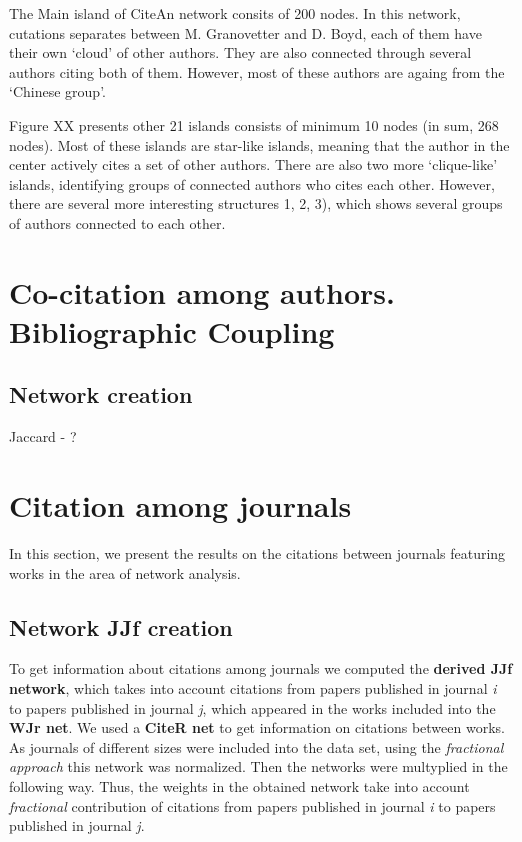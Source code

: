 \documentclass[11pt]{article} %
\begin{document}
The Main island of CiteAn network consits of 200 nodes. In this network, cutations separates between M. Granovetter and D. Boyd, each of them have their own `cloud' of other authors. They are also connected through several authors citing both of them. However, most of these authors are againg from the `Chinese group'.  \medskip  


Figure XX presents other 21 islands consists of minimum 10 nodes (in sum, 268 nodes). Most of these islands are star-like islands, meaning that the author in the center actively cites a set of other authors. There are also two more `clique-like' islands, identifying groups of connected authors who cites each other. However, there are several more interesting structures 1, 2, 3), which shows several groups of authors connected to each other. \medskip  


\section{Co-citation among authors. Bibliographic Coupling }

\subsection{Network creation} 

Jaccard - ? 

\section{Citation among journals}

In this section, we present the results on the citations between journals featuring works in the area of network analysis. 

\subsection{Network JJf creation}

To get information about citations among journals we computed the \textbf{derived JJf network}, which takes into account citations from papers published in journal \textit{i} to papers published in journal \textit{j}, which appeared in the works included into the \textbf{WJr net}. We used a \textbf{CiteR net} to get information on citations between works. As journals of different sizes were included into the data set, using the \textit{fractional approach} this network was normalized. Then the networks were multyplied in the following way. Thus, the weights in the obtained network take into account \textit{fractional} contribution of citations from papers published in journal \textit{i} to papers published in journal \textit{j}.   \medskip 
\end{document}
